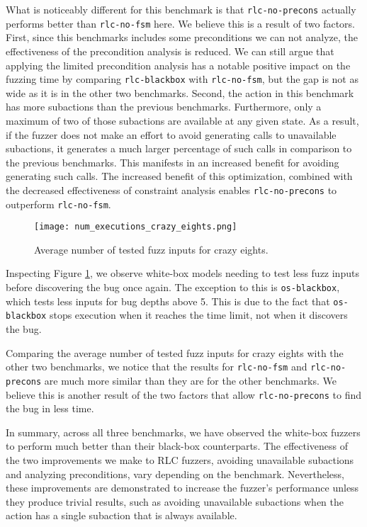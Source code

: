 What is noticeably different for this benchmark is that \texttt{rlc-no-precons} actually performs better than \texttt{rlc-no-fsm} here.
We believe this is a result of two factors.
First, since this benchmarks includes some preconditions we can not analyze, the effectiveness of the precondition analysis is reduced.
We can still argue that applying the limited precondition analysis has a notable positive impact on the fuzzing time by comparing \texttt{rlc-blackbox} with \texttt{rlc-no-fsm}, but the gap is not as wide as it is in the other two benchmarks.
Second, the action in this benchmark has more subactions than the previous benchmarks.
Furthermore, only a maximum of two of those subactions are available at any given state.
As a result, if the fuzzer does not make an effort to avoid generating calls to unavailable subactions, it generates a much larger percentage of such calls in comparison to the previous benchmarks.
This manifests in an increased benefit for avoiding generating such calls.
The increased benefit of this optimization, combined with the decreased effectiveness of constraint analysis enables \texttt{rlc-no-precons} to outperform \texttt{rlc-no-fsm}.

\begin{figure}[h]
    \centering
    \texttt{[image: num\_executions\_crazy\_eights.png]}
    \caption{Average number of tested fuzz inputs for crazy eights.}
    \label{avgInputsCrazyEights}
\end{figure}

Inspecting Figure \ref{avgInputsCrazyEights}, we observe white-box models needing to test less fuzz inputs before discovering the bug once again.
The exception to this is \texttt{os-blackbox}, which tests less inputs for bug depths above 5.
This is due to the fact that \texttt{os-blackbox} stops execution when it reaches the time limit, not when it discovers the bug.

Comparing the average number of tested fuzz inputs for crazy eights with the other two benchmarks, we notice that the results for \texttt{rlc-no-fsm} and \texttt{rlc-no-precons} are much more similar than they are for the other benchmarks.
We believe this is another result of the two factors that allow \texttt{rlc-no-precons} to find the bug in less time.

In summary, across all three benchmarks, we have observed the white-box fuzzers to perform much better than their black-box counterparts.
The effectiveness of the two improvements we make to RLC fuzzers, avoiding unavailable subactions and analyzing preconditions, vary depending on the benchmark.
Nevertheless, these improvements are demonstrated to increase the fuzzer's performance unless they produce trivial results, such as avoiding unavailable subactions when the action has a single subaction that is always available.

